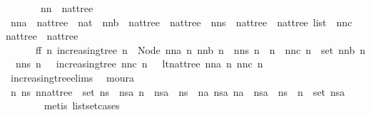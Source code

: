 \begin{isabellebody}
%
\isadelimproof
%
\endisadelimproof
%
\isatagproof
{}\isamarkupfalse%
\ {\isacharminus}\isanewline
\ \ \isacommand{{\isacharbraceleft}}\isamarkupfalse%
\ \isamarkupfalse%
\ nn\ {\isacharcolon}{\isacharcolon}\ nattree\isanewline
\ \ \ \ \isamarkupfalse%
\ nna\ {\isacharcolon}{\isacharcolon}\ {\isachardoublequoteopen}nattree\ {\isasymRightarrow}\ nat{\isachardoublequoteclose}\ \ nnb\ {\isacharcolon}{\isacharcolon}\ {\isachardoublequoteopen}nattree\ {\isasymRightarrow}\ nattree{\isachardoublequoteclose}\ \ nns\ {\isacharcolon}{\isacharcolon}\ {\isachardoublequoteopen}nattree\ {\isasymRightarrow}\ nattree\ list{\isachardoublequoteclose}\ \ nnc\ {\isacharcolon}{\isacharcolon}\ {\isachardoublequoteopen}nattree\ {\isasymRightarrow}\ nattree{\isachardoublequoteclose}\ \isanewline
\ \ \ \ \ \ ff{}{\isacharcolon}\ {\isachardoublequoteopen}{\isasymforall}n{\isachardot}\ increasing{\isacharunderscore}tree\ n\ {\isasymor}\ Node\ {\isacharparenleft}nna\ n{\isacharparenright}\ {\isacharparenleft}nnb\ n\ {\isacharhash}\ nns\ n{\isacharparenright}\ {\isacharequal}\ n\ {\isasymand}\ nnc\ n\ {\isasymin}\ set\ {\isacharparenleft}nnb\ n\ {\isacharhash}\ nns\ n{\isacharparenright}\ {\isasymand}\ {\isacharparenleft}{\isasymnot}\ increasing{\isacharunderscore}tree\ {\isacharparenleft}nnc\ n{\isacharparenright}\ {\isasymor}\ {\isasymnot}\ lt{\isacharunderscore}nat{\isacharunderscore}tree\ {\isacharparenleft}nna\ n{\isacharparenright}\ {\isacharparenleft}nnc\ n{\isacharparenright}{\isacharparenright}{\isachardoublequoteclose}\isanewline
\ \ \ \ \ \ \isamarkupfalse%
\ increasing{\isacharunderscore}tree{\isachardot}elims{\isacharparenleft}{}{\isacharparenright}\ \isamarkupfalse%
\ moura\isanewline
\ \ \ \ \isamarkupfalse%
\ {\isachardoublequoteopen}{\isasymforall}n\ ns{\isachardot}\ {\isacharparenleft}n{\isacharcolon}{\isacharcolon}nattree{\isacharparenright}\ {\isasymnotin}\ set\ ns\ {\isasymor}\ {\isacharparenleft}{\isasymexists}nsa{\isachardot}\ n\ {\isacharhash}\ nsa\ {\isacharequal}\ ns{\isacharparenright}\ {\isasymor}\ {\isacharparenleft}{\isasymexists}na\ nsa{\isachardot}\ na\ {\isacharhash}\ nsa\ {\isacharequal}\ ns\ {\isasymand}\ n\ {\isasymin}\ set\ nsa{\isacharparenright}{\isachardoublequoteclose}\isanewline
\ \ \ \ \ \ \isamarkupfalse%
\ {\isacharparenleft}metis\ list{\isachardot}set{\isacharunderscore}cases{\isacharparenright}\isanewline
\ \ \ \ \isamarkupfalse%

\end{isabellebody}
